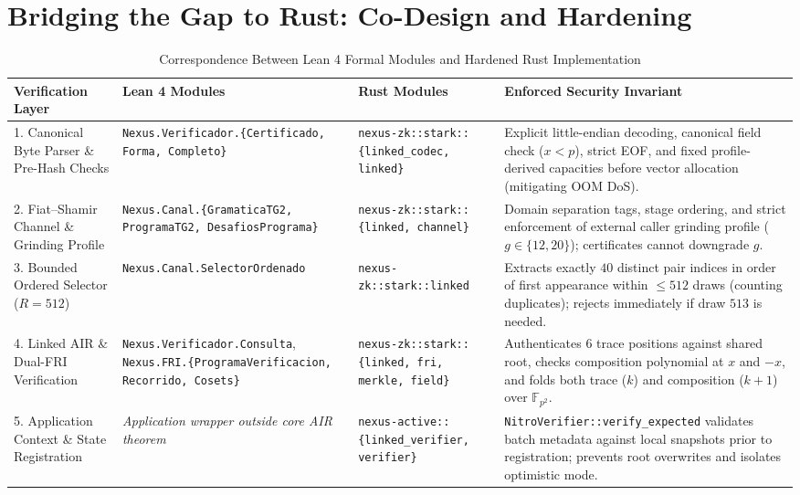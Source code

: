 \documentclass[conference]{IEEEtran}
\theoremstyle{definition}
\begin{document}
\section{Bridging the Gap to Rust: Co-Design and Hardening}
\label{sec:rust}

\begin{table}[t]
\centering
\caption{Correspondence Between Lean 4 Formal Modules and Hardened Rust Implementation}
\label{tab:alignment}
\footnotesize
\begin{tabular}{@{}p{2.9cm}p{4.1cm}p{3.9cm}p{5.1cm}@{}}
\toprule
\textbf{Verification Layer} & \textbf{Lean 4 Modules} & \textbf{Rust Modules} & \textbf{Enforced Security Invariant} \\
\midrule
\raggedright 1. Canonical Byte Parser \& Pre-Hash Checks & \raggedright\texttt{Nexus.Verificador.\allowbreak\{Certificado, Forma, Completo\}} & \raggedright\texttt{nexus-zk::stark::\allowbreak\{linked\_codec, linked\}} & Explicit little-endian decoding, canonical field check ($x < p$), strict EOF, and fixed profile-derived capacities before vector allocation (mitigating OOM DoS). \\
\addlinespace[2pt]
\raggedright 2. Fiat--Shamir Channel \& Grinding Profile & \raggedright\texttt{Nexus.Canal.\allowbreak\{GramaticaTG2, ProgramaTG2, DesafiosPrograma\}} & \raggedright\texttt{nexus-zk::stark::\allowbreak\{linked, channel\}} & Domain separation tags, stage ordering, and strict enforcement of external caller grinding profile ($g \in \{12, 20\}$); certificates cannot downgrade $g$. \\
\addlinespace[2pt]
\raggedright 3. Bounded Ordered Selector ($R = 512$) & \raggedright\texttt{Nexus.Canal.\allowbreak SelectorOrdenado} & \raggedright\texttt{nexus-zk::stark::\allowbreak linked} & Extracts exactly $40$ distinct pair indices in order of first appearance within $\le 512$ draws (counting duplicates); rejects immediately if draw $513$ is needed. \\
\addlinespace[2pt]
\raggedright 4. Linked AIR \& Dual-FRI Verification & \raggedright\texttt{Nexus.Verificador.Consulta}, \texttt{Nexus.FRI.\allowbreak\{ProgramaVerificacion, Recorrido, Cosets\}} & \raggedright\texttt{nexus-zk::stark::\allowbreak\{linked, fri, merkle, field\}} & Authenticates $6$ trace positions against shared root, checks composition polynomial at $x$ and $-x$, and folds both trace ($k$) and composition ($k+1$) over $\mathbb{F}_{p^2}$. \\
\addlinespace[2pt]
\raggedright 5. Application Context \& State Registration & \raggedright\textit{Application wrapper outside core AIR theorem} & \raggedright\texttt{nexus-active::\allowbreak\{linked\_verifier, verifier\}} & \texttt{NitroVerifier::verify\_expected} validates batch metadata against local snapshots prior to registration; prevents root overwrites and isolates optimistic mode. \\
\bottomrule
\end{tabular}
\end{table}
\end{document}
